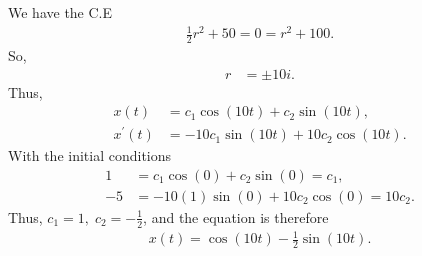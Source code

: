 \documentclass{report}
\begin{document}
    We have the C.E
    \begin{align*}
        \frac{1}{2}r^{2} + 50 = 0 = r^{2} + 100
    .\end{align*}
    So,
    \begin{align*}
        r &= \pm 10i
    .\end{align*}
    Thus,
    \begin{align*}
        x(t) &= c_{1}\cos{\left(10t\right)} + c_{2}\sin{\left(10t\right)}, \\
        x^{\prime}(t) &= -10c_{1}\sin{\left(10t\right)} +10c_{2}\cos{\left(10t\right)}
    .\end{align*}
    With the initial conditions
    \begin{align*}
        1 &= c_{1}\cos{\left(0\right)} + c_{2}\sin{\left(0\right)} = c_{1}, \\
        -5 &= -10(1)\sin{\left(0\right)} + 10c_{2}\cos{\left(0\right)} = 10c_{2}
    .\end{align*}
    Thus, $c_{1} = 1,\; c_{2} = -\frac{1}{2}$, and the equation is therefore
    \begin{align*}
        x(t) = \cos{\left(10t\right)} -\frac{1}{2} \sin{\left(10t\right)}
    .\end{align*}
\end{document}
